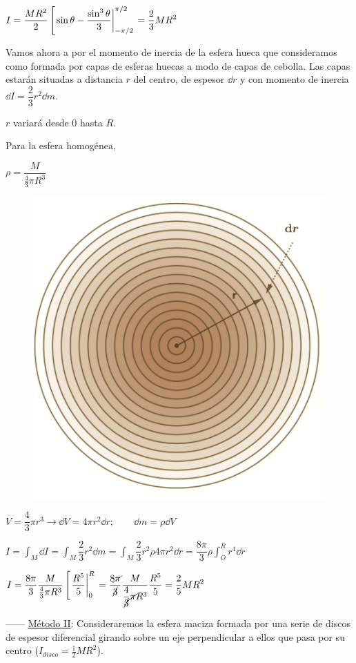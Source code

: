 $\displaystyle I=\dfrac{MR^2}{2} \left[\eval{\sin \theta - \dfrac {\sin^3 \theta}{3}}_{-\pi/2}^{\pi/2}\right.=\dfrac 2 3 MR^2$

\vspace{10mm} %
\begin{multicols}{2}
Vamos ahora a por el momento de inercia de la esfera hueca que consideramos como formada por capas de esferas huecas a modo de capas de cebolla. Las capas estarán situadas a distancia $r$ del centro, de espesor $\dd r$ y con momento de inercia $\dd I=\dfrac 2 3 r^2 \dd m$. 

$r$ variará desde $0$ hasta $R$.

Para la esfera homogénea, 

$\rho=\dfrac {M}{\frac 4 3 \pi R^3}$
\begin{figure}[H]
	\centering
	\includegraphics[width=.5\textwidth]{imagenes/imagenes16/T16IM17.png}
\end{figure}
\end{multicols}

$V=\dfrac 4 3 \pi r^3 \to \dd V=4\pi r^2 \dd r;\qquad \dd m= \rho \dd V$

$\displaystyle I=\int_M \dd I =\int_M \dfrac 2 3 r^2 \dd m = \int_M \dfrac 2 3 r^2 \rho  4  \pi r^2 \dd r = \dfrac {8\pi}{3}\rho \int_O^R r^4 \dd r$

$\displaystyle I=
\dfrac {8\pi}{3} \dfrac {M}{\frac 4 3 \pi R^3} \left[ \eval{\dfrac {R^5}{5}}_0^R \right. = 
\dfrac {8\cancel{\pi}}{\cancel{3}} \dfrac{M}{\dfrac{4}{\cancel{3}}\cancel{\pi} R^3} \dfrac{R^5}{5} = \dfrac 2 5 M R^2$


\vspace{10mm} %
------ \underline{Método II}: Consideraremos la esfera maciza formada por una serie de discos de espesor diferencial girando sobre un eje perpendicular a ellos que pasa por su centro ($I_{disco}=\frac 1 2 MR^2$).

